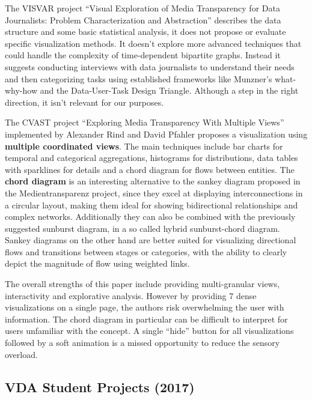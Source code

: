 \documentclass{vgtc}
\begin{document}
\medskip

The VISVAR project ``Visual Exploration of Media Transparency for Data Journalists: Problem Characterization and Abstraction'' \cite{aigner2016visual} describes the data structure and some basic statistical analysis, it does not propose or evaluate specific visualization methods. It doesn't explore more advanced techniques that could handle the complexity of time-dependent bipartite graphs. Instead it suggests conducting interviews with data journalists to understand their needs and then categorizing tasks using established frameworks like Munzner's what-why-how and the Data-User-Task Design Triangle. Although a step in the right direction, it isn't relevant for our purposes.

\medskip

The CVAST project ``Exploring Media Transparency With Multiple Views'' \cite{rind2016exploring} implemented by Alexander Rind and David Pfahler \cite{gitmtdb2} proposes a visualization using \textbf{multiple coordinated views}. The main techniques include bar charts for temporal and categorical aggregations, histograms for distributions, data tables with sparklines for details and a chord diagram for flows between entities. The \textbf{chord diagram} is an interesting alternative to the sankey diagram proposed in the Medientransparenz project, since they excel at displaying interconnections in a circular layout, making them ideal for showing bidirectional relationships and complex networks. Additionally they can also be combined with the previously suggested sunburst diagram, in a so called hybrid sunburst-chord diagram. Sankey diagrams on the other hand are better suited for visualizing directional flows and transitions between stages or categories, with the ability to clearly depict the magnitude of flow using weighted links.

The overall strengths of this paper include providing multi-granular views, interactivity and explorative analysis. However by providing 7 dense visualizations on a single page, the authors risk overwhelming the user with information. The chord diagram in particular can be difficult to interpret for users unfamiliar with the concept. A single ``hide'' button for all visualizations followed by a soft animation is a missed opportunity to reduce the sensory overload.

\subsection{VDA Student Projects (2017)}
\end{document}
